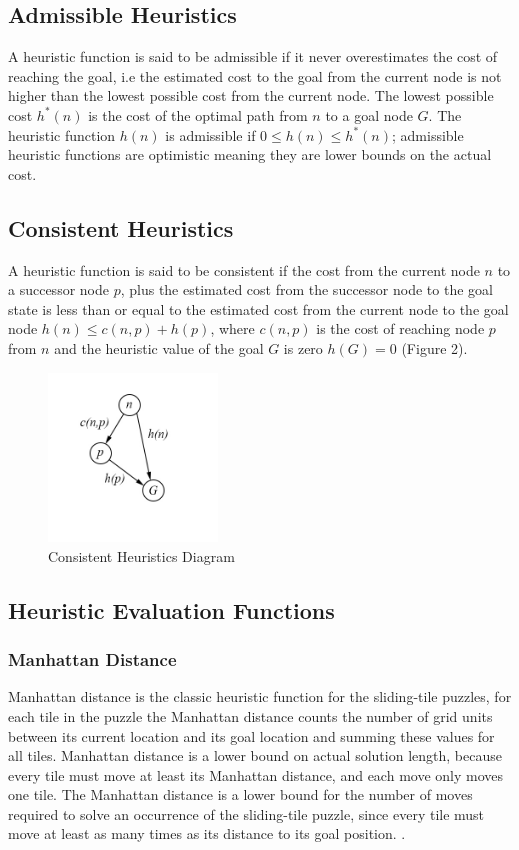 \documentclass[final]{cmpreport}
\begin{document}
\subsection{Admissible Heuristics}
A heuristic function is said to be admissible if it never overestimates the cost of reaching the goal, i.e the estimated cost to the goal from the current node is not higher than the lowest possible cost from the current node. The lowest possible cost $h^*(n)$ is the cost of the optimal path from $n$ to a goal node $G$. The heuristic function $h(n)$ is admissible if $0 \leq h(n) \leq h^*(n)$; admissible heuristic functions are optimistic meaning they are lower bounds on the actual cost.

\subsection{Consistent Heuristics}
 A heuristic function is said to be consistent if the cost from the current node $n$ to a successor node $p$, plus the estimated cost from the successor node to the goal state is less than or equal to the estimated cost from the current node to the goal node $h(n)\leq c(n,p) + h(p)$, where $c(n,p)$ is the cost of reaching node $p$ from $n$ and the heuristic value of the goal $G$ is zero $h(G)=0$ (Figure 2). 


\begin{figure}[ht]
	\centering
	\includegraphics[width=0.4\textwidth]{consistent}
	\captionsetup{justification=centering}
	\caption{Consistent Heuristics Diagram}
\end{figure}

\subsection{Heuristic Evaluation Functions}
\subsubsection{Manhattan Distance}
Manhattan distance is the classic heuristic function for the sliding-tile puzzles, for each tile in the puzzle the Manhattan distance counts the number of grid units between its current location
and its goal location and summing these values for all tiles. Manhattan distance is a lower bound on actual solution length, because every tile must move at least its Manhattan distance, and each move only moves one tile. The Manhattan distance is a lower bound for the number of moves required to solve an occurrence of the sliding-tile puzzle, since every tile must move at least as many times as its distance to its goal position. \citep{DBLP:conf/ccgrid/LinnertSB14}.
\end{document}
